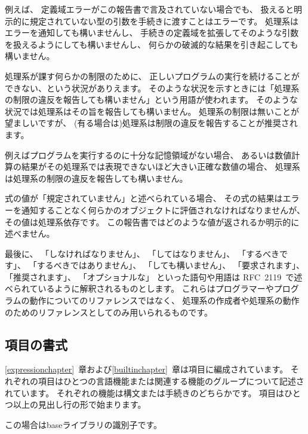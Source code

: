 例えば、
定義域エラーがこの報告書で言及されていない場合でも、
扱えると明示的に規定されていない型の引数を手続きに渡すことはエラーです。
処理系はエラーを通知しても構いませんし、
手続きの定義域を拡張してそのような引数を扱えるようにしても構いませんし、
何らかの破滅的な結果を引き起こしても構いません。

\vest 処理系が課す何らかの制限のために、
正しいプログラムの実行を続けることができない、という状況がありえます。
そのような状況を示すときには「処理系の制限の違反を報告しても構いません」という用語が使われます。
そのような状況では処理系はその旨を報告しても構いません。
処理系の制限は無いことが望ましいですが、
(有る場合は)処理系は制限の違反を報告することが推奨されます。

\vest 例えばプログラムを実行するのに十分な記憶領域がない場合、
あるいは数値計算の結果がその処理系では表現できないほど大きい正確な数値の場合、
処理系は処理系の制限の違反を報告しても構いません。

\vest 式の値が「規定されていません」と述べられている場合、
その式の結果はエラーを通知することなく何らかのオブジェクトに評価されなければなりませんが、
その値は処理系依存です。
この報告書ではどのような値が返されるか明示的に述べません。

\vest 最後に、
「しなければなりません」、
「してはなりません」、
「するべきです」、
「するべきではありません」、
「しても構いません」、
「要求されます」、
「推奨されます」、
「オプショナルな」
といった語句や用語は
RFC~2119~\cite{rfc2119}で述べられているように解釈されるものとします。
これらはプログラマーやプログラムの動作についてのリファレンスではなく、
処理系の作成者や処理系の動作のためのリファレンスとしてのみ用いられるものです。



\subsection{項目の書式}

\ref{expressionchapter}~章および\ref{builtinchapter}~章は項目に編成されています。
それぞれの項目はひとつの言語機能または関連する機能のグループについて記述されています。
それぞれの機能は構文または手続きのどちらかです。
項目はひとつ以上の見出し行の形で始まります。

\noindent{}\unpenalty

この場合はbaseライブラリの識別子です。

\noindent{}\unpenalty

